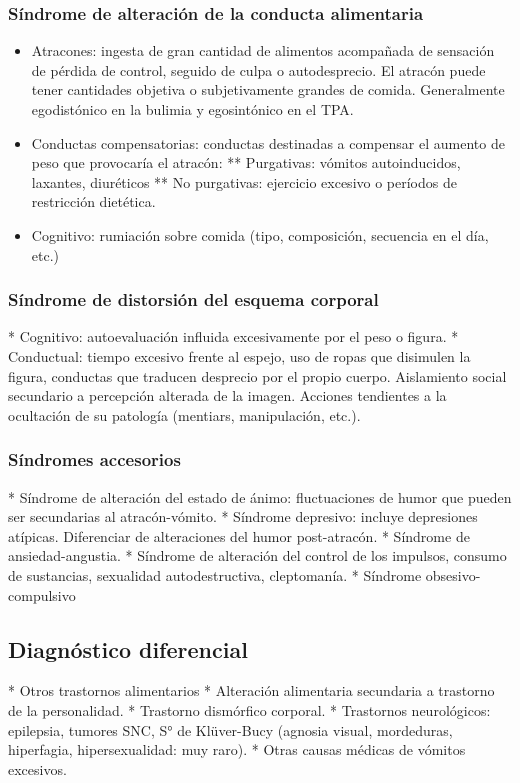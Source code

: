 \subsubsection*{Síndrome de alteración de la conducta alimentaria}
\begin{itemize}
	\item Atracones: ingesta de gran cantidad de alimentos acompañada de sensación de pérdida de control, seguido de culpa o autodesprecio. El atracón puede tener cantidades objetiva o subjetivamente grandes de comida. Generalmente egodistónico en la bulimia y egosintónico en el TPA.
	\item Conductas compensatorias: conductas destinadas a compensar el aumento de peso que provocaría el atracón:
** Purgativas: vómitos autoinducidos, laxantes, diuréticos
** No purgativas: ejercicio excesivo o períodos de restricción dietética.
	\item Cognitivo: rumiación sobre comida (tipo, composición, secuencia en el día, etc.)
\end{itemize}

\subsubsection*{Síndrome de distorsión del esquema corporal}
* Cognitivo: autoevaluación influida excesivamente por el peso o figura.
* Conductual: tiempo excesivo frente al espejo, uso de ropas que disimulen la figura, conductas que traducen desprecio por el propio cuerpo. Aislamiento social secundario a percepción alterada de la imagen. Acciones tendientes a la ocultación de su patología (mentiars, manipulación, etc.).
\subsubsection*{Síndromes accesorios}
* Síndrome de alteración del estado de ánimo: fluctuaciones de humor que pueden ser secundarias al atracón-vómito.
* Síndrome depresivo: incluye depresiones atípicas. Diferenciar de alteraciones del humor post-atracón.
* Síndrome de ansiedad-angustia.
* Síndrome de alteración del control de los impulsos, consumo de sustancias, sexualidad autodestructiva, cleptomanía.
* Síndrome obsesivo-compulsivo
\subsection*{Diagnóstico diferencial}

* Otros trastornos alimentarios
* Alteración alimentaria secundaria a trastorno de la personalidad.
* Trastorno dismórfico corporal.
* Trastornos neurológicos: epilepsia, tumores SNC, S° de Klüver-Bucy (agnosia visual, mordeduras, hiperfagia, hipersexualidad: muy raro).
* Otras causas médicas de vómitos excesivos.

